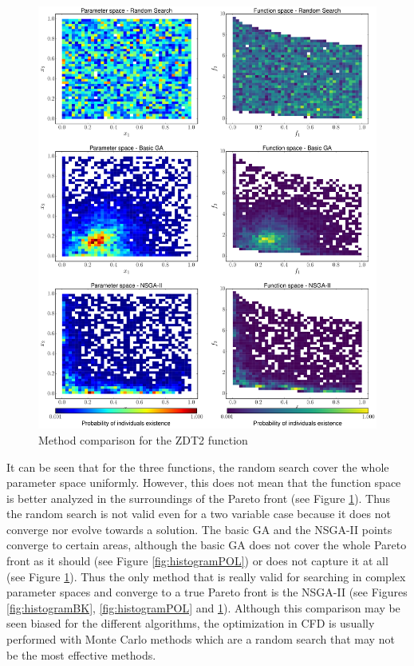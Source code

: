     \begin{figure}[H]
        \centering
        \includegraphics[height=0.96\textheight, width=\textwidth]{Figures/3/hist_ZDT2.pdf}
        \caption{Method comparison for the ZDT2 function}
        \label{fig:histogramZDT2}
    \end{figure}
    
\newpage

It can be seen that for the three functions, the random search cover the whole parameter space uniformly. However, this does not mean that the function space is better analyzed in the surroundings of the Pareto front (see Figure \ref{fig:histogramZDT2}). Thus the random search is not valid even for a two variable case because it does not converge nor evolve towards a solution. The basic GA and the NSGA-II points converge to certain areas, although the basic GA does not cover the whole Pareto front as it should (see Figure \ref{fig:histogramPOL}) or does not capture it at all (see Figure \ref{fig:histogramZDT2}). Thus the only method that is really valid for searching in complex parameter spaces and converge to a true Pareto front is the NSGA-II (see Figures \ref{fig:histogramBK}, \ref{fig:histogramPOL} and \ref{fig:histogramZDT2}). Although this comparison may be seen biased for the different algorithms, the optimization in CFD is usually performed with Monte Carlo methods which are a random search that may not be the most effective methods. 

